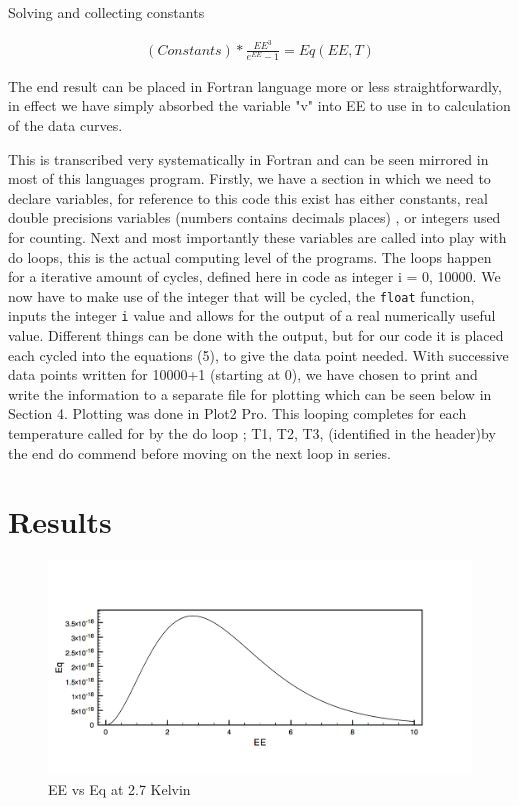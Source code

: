 \documentclass[12pt]{article}
\begin{document}
Solving and collecting constants 

\begin{align} 
(Constants)*\frac {EE^3}{e^{EE}-1} = Eq(EE,T) 
\end{align}

The end result can be placed in Fortran language more or less straightforwardly, in effect we have simply absorbed the variable "v" into EE to use in to calculation of the data curves.

This is transcribed very systematically in Fortran and can be seen mirrored in most of this languages program. Firstly, we have a section in which we need to declare variables, for reference to this code this exist has either constants, real double precisions variables (numbers contains decimals places) , or integers used for counting. Next and most importantly these variables are called into play with do loops, this is the actual computing level of the programs. The loops happen for a iterative amount of cycles, defined here in code as integer i = 0, 10000. We now have to make use of the integer that will be cycled, the {\tt{float}} function, inputs the integer {\tt{i}} value and allows for the output of a real numerically useful value. Different things can be done with the output, but for our code it is placed each cycled into the equations (5), to give the data point needed. With successive data points written for 10000+1 (starting at 0), we have chosen to print and write the information to a separate file for plotting which can be seen below in Section 4. Plotting was done in Plot2 Pro. This looping completes for each temperature called for by the do loop ; T1, T2, T3, (identified in the header)by the end do commend before moving on the next loop in series. 

\section {Results} 
\begin{figure}[H]
	\centering
	\includegraphics[width=1.\textwidth]{11.png}
	\caption{EE vs Eq at 2.7 Kelvin}
\end{figure}
\end{document}
